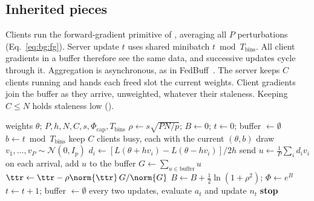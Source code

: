 \subsection{Inherited pieces}
\label{sec:ft:inherited}
\label{sec:ft:fg}
\label{sec:ft:async}

Clients run the forward-gradient primitive of ,
averaging all $P$ perturbations (Eq.~\eqref{eq:bg:fg}). Server update
$t$ uses shared minibatch $t\bmod T_{\mathrm{bins}}$. All client
gradients in a buffer therefore see the same data, and successive
updates cycle through it. Aggregation is asynchronous, as in
FedBuff~\cite{nguyen2022fedbuff}. The server keeps $C$ clients running
and hands each freed slot the current weights. Client gradients join
the buffer as they arrive, unweighted, whatever their staleness.
Keeping $C\le N$ holds staleness low ().

\begin{algorithm}[t]
\caption{\sys}
\label{alg:fluxtune}
\begin{algorithmic}[1]
\Require weights $\theta$; $P,h,N,C,s,\Phi_{\mathrm{cap}},T_{\mathrm{bins}}$
\State $\rho\gets s\sqrt{PN/p}$;\; $B\gets 0$;\; $t\gets 0$;\; buffer $\gets\emptyset$
  \State $b\gets t\bmod T_{\mathrm{bins}}$ 
  \State keep $C$ clients busy, each with the current $(\theta,b)$
    \State draw $v_1,\dots,v_P\sim\mathcal{N}(0,I_p)$
    \State $d_i\gets[L(\theta{+}hv_i)-L(\theta{-}hv_i)]/2h$ 
    \State send $u\gets\frac1P\sum_i d_iv_i$
  \EndFor
  \State on each arrival, add $u$ to the buffer 
    \State $G\gets\sum_{u\in\text{buffer}}u$
      \State $\ttr\gets\ttr-\rho\norm{\ttr}\,G/\norm{G}$ 
    \EndIf
    \State $B\gets B+\tfrac12\ln(1+\rho^2)$;\; $\Phi\gets e^{B}$ 
    \State $t\gets t+1$;\; buffer $\gets\emptyset$
    \State every two updates, evaluate $a_t$ and update $n_t$
     
      \State \textbf{stop}
    \EndIf
  \EndIf
\EndWhile
\end{algorithmic}
\end{algorithm}

